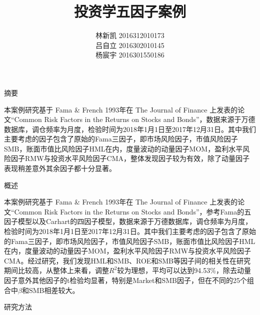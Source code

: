 \documentclass[11pt]{article}
\title{\heiti \zihao{1}投资学五因子案例}
\author{\heiti \zihao{5}林新凯 2016312010173\\ \heiti \zihao{5}吕自立 2016302010145\\ \heiti \zihao{5}杨宸宇 2016301550186}
\date{}
\begin{document}
    
    
    \maketitle
    \begin{center}
        \heiti {}摘要
    \end{center}
    \par \indent
    \heiti 本案例研究基于 Fama \& French 1993年在 The Journal of Finance 上发表的论文“Common Risk Factors in the Returns on Stocks and Bonds”，数据来源于万德数据库，调仓频率为月度，检验时间为2018年1月1日至2017年12月31日。其中我们主要考虑的因子包含了原始的Fama三因子，即市场风险因子，市值风险因子SMB，账面市值比风险因子HML在内，度量波动的动量因子MOM，盈利水平风险因子RMW与投资水平风险因子CMA，整体发现因子较为有效，除了动量因子表现稍差意外其余因子都十分显著。\\







    \begin{center}
        \heiti {}概述
    \end{center}
    \par \indent
    \heiti 本案例研究基于 Fama \& French 1993年在 The Journal of Finance 上发表的论文“Common Risk Factors in the Returns on Stocks and Bonds”，参考Fama的五因子模型以及Carhart的四因子模型，数据来源于万德数据库，调仓频率为月度，检验时间为2018年1月1日至2017年12月31日。其中我们主要考虑的因子包含了原始的Fama三因子，即市场风险因子，市值风险因子SMB，账面市值比风险因子HML在内，度量波动的动量因子MOM，盈利水平风险因子RMW与投资水平风险因子CMA。经过研究，我们发现HML和SMB、ROE和SMB等因子间的相关性在研究期间比较高，从整体上来看，调整$R^2$较为理想，平均可以达到94.53\%，除去动量因子意外其他因子的t检验均显著，特别是Market和SMB因子，但在不同的25个组合中$\beta$和SMB相差较大。\\


    \begin{center}
        \heiti {}研究方法
    \end{center}
    
\end{document}
